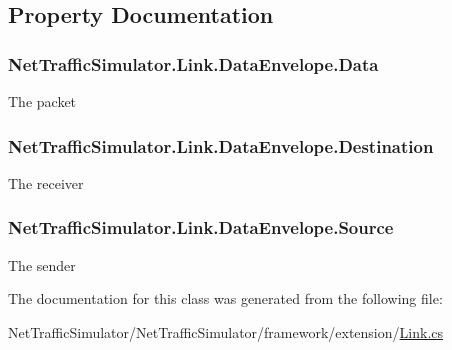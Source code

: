 \subsection{Property Documentation}
\hypertarget{classNetTrafficSimulator_1_1Link_1_1DataEnvelope_ad3d68bcc1cbf160648beeaca939cbd51}{
\subsubsection[{Data}]{ Net\-Traffic\-Simulator.\-Link.\-Data\-Envelope.\-Data\hspace{0.3cm}{\ttfamily [get]}}}\label{classNetTrafficSimulator_1_1Link_1_1DataEnvelope_ad3d68bcc1cbf160648beeaca939cbd51}
The packet \hypertarget{classNetTrafficSimulator_1_1Link_1_1DataEnvelope_af8789d5ec0a0dd7087e33dc532cb0237}{
\subsubsection[{Destination}]{ Net\-Traffic\-Simulator.\-Link.\-Data\-Envelope.\-Destination\hspace{0.3cm}{\ttfamily [get]}}}\label{classNetTrafficSimulator_1_1Link_1_1DataEnvelope_af8789d5ec0a0dd7087e33dc532cb0237}
The receiver \hypertarget{classNetTrafficSimulator_1_1Link_1_1DataEnvelope_a172d3b86ed384f803eabfa751c4f296f}{
\subsubsection[{Source}]{ Net\-Traffic\-Simulator.\-Link.\-Data\-Envelope.\-Source\hspace{0.3cm}{\ttfamily [get]}}}\label{classNetTrafficSimulator_1_1Link_1_1DataEnvelope_a172d3b86ed384f803eabfa751c4f296f}
The sender 

The documentation for this class was generated from the following file\-:\begin{DoxyCompactItemize}
\item 
Net\-Traffic\-Simulator/\-Net\-Traffic\-Simulator/framework/extension/\hyperlink{Link_8cs}{Link.\-cs}\end{DoxyCompactItemize}
